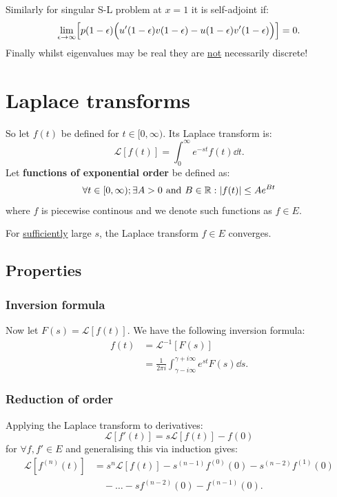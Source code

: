 \documentclass{article}
\begin{document}
\begin{multicols}{3}
Similarly for singular S-L problem at $x=1$ it is self-adjoint if:
$$\lim_{\epsilon\rightarrow\infty}
\Bigl[p(1-\epsilon)
\Bigl(u'(1-\epsilon)v(1-\epsilon)-u(1-\epsilon)v'(1-\epsilon)\Bigr)\Bigr]=0.$$
Finally whilst eigenvalues may be real they are \underline{not}
necessarily discrete!

\section{Laplace transforms}
So let $f(t)$ be defined for $t\in[0,\infty)$. Its Laplace transform is:
$$\mathcal{L}[f(t)]=\int_{0}^{\infty}e^{-st}f(t)\dd t.$$
Let \textbf{functions of exponential order} be defined as:
$$\forall t\in[0,\infty);\exists A>0\hspace{0.05in}\text{and}\hspace{0.05in}
B\in\mathbb{R}:|f(t)|\leq Ae^{Bt}$$
where $f$ is piecewise continous and
we denote such functions as $f\in E$.

For \underline{sufficiently} large $s$, the Laplace transform
$f\in E$ converges.

\subsection{Properties}
\subsubsection{Inversion formula}
Now let $F(s)=\mathcal{L}[f(t)]$. We have
the following inversion formula:
\begin{align*}
    f(t)
    &=\mathcal{L}^{-1}[F(s)] \\
    &=\frac{1}{2\pi i}\int_{\gamma-i\infty}^
    {\gamma+i\infty}e^{st}F(s)\dd s.
\end{align*}

\subsubsection{Reduction of order}
Applying the Laplace transform to derivatives:
$$\mathcal{L}[f'(t)]=s\mathcal{L}[f(t)]-f(0)$$
for $\forall f,f'\in E$ and 
generalising this via induction gives:
\begin{align*}
    \mathcal{L}[f^{(n)}(t)]
    &=s^n\mathcal{L}[f(t)]
    -s^{(n-1)}f^{(0)}(0)-s^{(n-2)}f^{(1)}(0) \\
    &\quad-\dots-sf^{(n-2)}(0)-f^{(n-1)}(0).
\end{align*}


\end{multicols}
\end{document}
